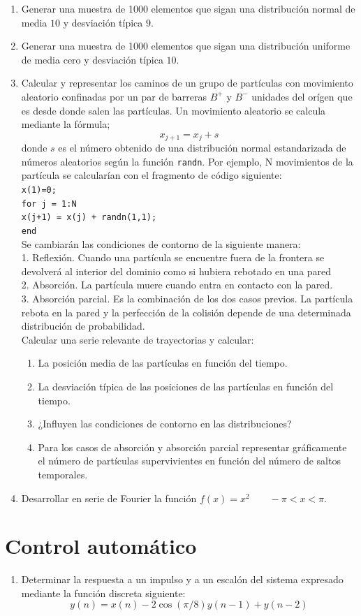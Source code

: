 \begin{enumerate}
\item Generar una muestra de 1000 elementos que sigan una distribución
  normal de media $10$ y desviación típica $9$.
\item Generar una muestra de 1000 elementos que sigan una distribución
  uniforme de media cero y desviación típica $10$.
\item Calcular y representar los caminos de un grupo de partículas con
  movimiento aleatorio confinadas por un par de barreras $B^{+}$ y
  $B^{-}$ unidades del orígen que es desde donde salen las partículas.
  Un movimiento aleatorio se calcula mediante la fórmula;
$$ x_{j+1}=x_{j}+s$$ donde $s$ es el número obtenido de una
  distribución normal estandarizada de números aleatorios según la
  función \texttt{randn}. Por ejemplo, N movimientos de la partícula
  se calcularían con el fragmento de código
  siguiente:\\
  \texttt{x(1)=0;}~\\
  \texttt{for j = 1:N}~\\
  \texttt{x(j+1) = x(j) + randn(1,1);}~\\
  \texttt{end}~\\
  Se cambiarán las condiciones de contorno de la siguiente manera:\\
  1. Reflexión. Cuando una partícula se encuentre fuera de la frontera
  se devolverá al interior del dominio como si hubiera rebotado en una
  pared\\
  2. Absorción. La partícula muere cuando entra en contacto con la pared.\\
  3. Absorción parcial. Es la combinación de los dos casos previos.
  La partícula rebota en la pared y la perfección de la colisión
  depende
  de una determinada distribución de probabilidad.\\
  Calcular una serie relevante de trayectorias y calcular:

  \begin{enumerate}
  \item La posición media de las partículas en función del tiempo.
  \item La desviación típica de las posiciones de las partículas en
    función del tiempo.
  \item ¿Influyen las condiciones de contorno en las distribuciones?
  \item Para los casos de absorción y absorción parcial representar
    gráficamente el número de partículas supervivientes en función del
    número de saltos temporales.
  \end{enumerate}
\item Desarrollar en serie de Fourier la función
  $f(x)=x^{2}\qquad-\pi<x<\pi$.
\end{enumerate}

\section{Control automático}

\begin{enumerate}
\item Determinar la respuesta a un impulso y a un escalón del sistema expresado
mediante la función discreta siguiente:$$
y(n)=x(n)-2\cos(\pi/8)y(n-1)+y(n-2)$$

\end{enumerate}
